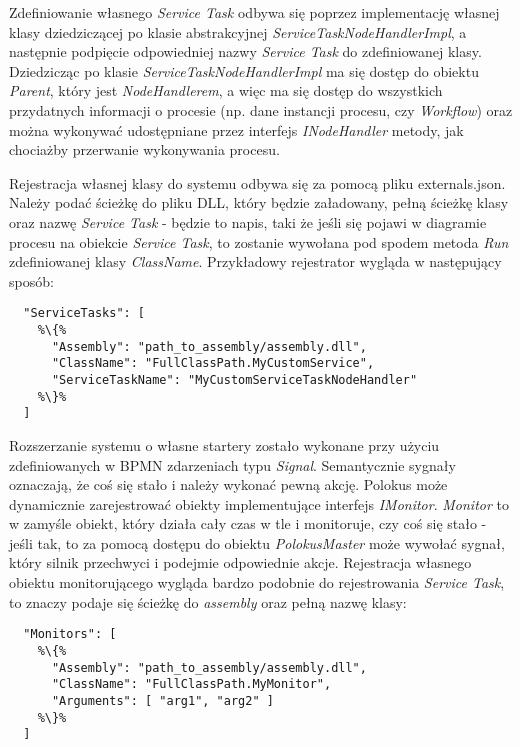 \documentclass[declaration,shortabstract,mgr]{iithesis}
\newcommand{\bpmn}{BPMN }
\begin{document}
Zdefiniowanie własnego \textit{Service Task} odbywa się poprzez implementację własnej klasy dziedziczącej po klasie abstrakcyjnej \textit{ServiceTaskNodeHandlerImpl}, a następnie podpięcie odpowiedniej nazwy \textit{Service Task} do zdefiniowanej klasy. Dziedzicząc po klasie \textit{ServiceTaskNodeHandlerImpl} ma się dostęp do obiektu \textit{Parent}, który jest \textit{NodeHandlerem}, a więc ma się dostęp do wszystkich przydatnych informacji o procesie (np. dane instancji procesu, czy \textit{Workflow}) oraz można wykonywać udostępniane przez interfejs \textit{INodeHandler} metody, jak chociażby przerwanie wykonywania procesu.

Rejestracja własnej klasy do systemu odbywa się za pomocą pliku externals.json. Należy podać ścieżkę do pliku DLL, który będzie załadowany, pełną ścieżkę klasy oraz nazwę \textit{Service Task} - będzie to napis, taki że jeśli się pojawi w diagramie procesu na obiekcie \textit{Service Task}, to zostanie wywołana pod spodem metoda \textit{Run} zdefiniowanej klasy \textit{ClassName}. Przykładowy rejestrator wygląda w następujący sposób:

\begin{minipage}[c]{\textwidth}
\centering
\begin{lstlisting}
  "ServiceTasks": [
    %\{%
      "Assembly": "path_to_assembly/assembly.dll",
      "ClassName": "FullClassPath.MyCustomService",
      "ServiceTaskName": "MyCustomServiceTaskNodeHandler"
    %\}%
  ]
\end{lstlisting}
\end{minipage}

Rozszerzanie systemu o własne startery zostało wykonane przy użyciu zdefiniowanych w \bpmn zdarzeniach typu \textit{Signal}. Semantycznie sygnały oznaczają, że coś się stało i należy wykonać pewną akcję. Polokus może dynamicznie zarejestrować obiekty implementujące interfejs \textit{IMonitor}. \textit{Monitor} to w zamyśle obiekt, który działa cały czas w tle i monitoruje, czy coś się stało - jeśli tak, to za pomocą dostępu do obiektu \textit{PolokusMaster} może wywołać sygnał, który silnik przechwyci i podejmie odpowiednie akcje. Rejestracja własnego obiektu monitorującego wygląda bardzo podobnie do rejestrowania \textit{Service Task}, to znaczy podaje się ścieżkę do \textit{assembly} oraz pełną nazwę klasy:

\begin{minipage}[c]{\textwidth}
\centering
\begin{lstlisting}
  "Monitors": [
    %\{%
      "Assembly": "path_to_assembly/assembly.dll",
      "ClassName": "FullClassPath.MyMonitor",
      "Arguments": [ "arg1", "arg2" ]
    %\}%
  ]
\end{lstlisting}
\end{minipage}
\end{document}
